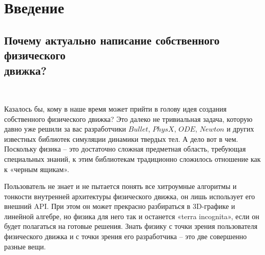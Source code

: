 \chapter*{Введение}

\section{Почему актуально написание собственного физического \\ движка?} 
\ %


%
Казалось бы, кому в наше время может прийти в голову
идея создания собственного физического движка? Это далеко не
тривиальная задача, которую давно уже решили за вас
разработчики $Bullet$, $PhysX$, $ODE$, $Newton$ и других известных
библиотек симуляции динамики твердых тел. А дело вот в чем.
\\

Поскольку физика – это достаточно сложная предметная
область, требующая специальных знаний, к этим библиотекам
традиционно сложилось отношение как к «черным ящикам».

Пользователь не знает и не пытается понять все хитроумные
алгоритмы и тонкости внутренней архитектуры физического
движка, он лишь использует его внешний API. При этом он
может прекрасно разбираться в 3D-графике и линейной
алгебре, но физика для него так и останется «terra incognita»,
если он будет полагаться на готовые решения.
Знать физику с точки зрения пользователя физического
движка и с точки зрения его разработчика – это две совершенно
разные вещи.
\\

